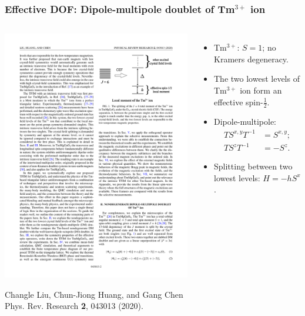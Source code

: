 \documentclass[xcolor=table, aspectratio=1610,ignorenonframetext]{beamer}
\begin{document}
\begin{frame}
  \frametitle{Effective DOF: Dipole-multipole doublet of Tm${}^{3+}$ ion}
  \begin{columns}
    \begin{center}
      \includegraphics[width=\textwidth]{tm3+}

      {\small Changle Liu, Chun-Jiong Huang, and Gang Chen\\
        Phys. Rev. Research \textbf{2}, 043013 (2020).}
    \end{center}
    \begin{itemize}
    \item Tm${}^{3+}$: $S=1$; no Kramers degeneracy.
    \item The two lowest levels of Tm${}^{3+}$ ion form an effective spin-$\frac12$.
    \item Dipole-multipole:
      \begin{align*}TS^{x,y}T^{-1}&=S^{x,y};\\
        TS^zT^{-1}&=-S^z.\end{align*}
    \item Splitting between two lowest levels: $H=-hS^x$.
    \end{itemize}
  \end{columns}
\end{frame}
\end{document}
